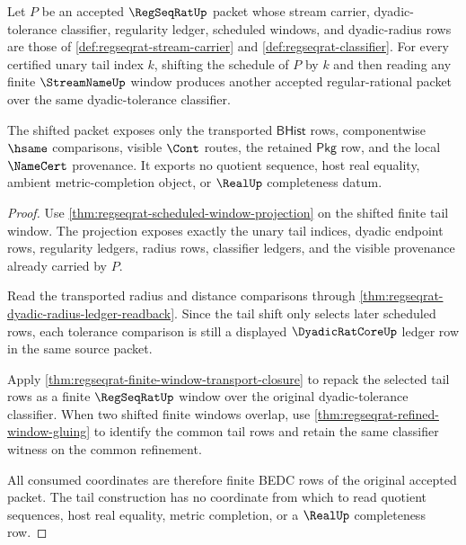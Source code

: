 \begin{theorem}
\label{thm:regseqrat-shifted-tail-regularity-closure}
Let $P$ be an accepted $\RegSeqRatUp$ packet whose stream carrier, dyadic-tolerance classifier, regularity ledger, scheduled windows, and dyadic-radius rows are those of \autoref{def:regseqrat-stream-carrier} and \autoref{def:regseqrat-classifier}. For every certified unary tail index $k$, shifting the schedule of $P$ by $k$ and then reading any finite $\StreamNameUp$ window produces another accepted regular-rational packet over the same dyadic-tolerance classifier.

The shifted packet exposes only the transported $\mathsf{BHist}$ rows, componentwise $\hsame$ comparisons, visible $\Cont$ routes, the retained $\mathsf{Pkg}$ row, and the local $\NameCert$ provenance. It exports no quotient sequence, host real equality, ambient metric-completion object, or $\RealUp$ completeness datum.
\end{theorem}
\begin{proof}
Use \autoref{thm:regseqrat-scheduled-window-projection} on the shifted finite tail window. The projection exposes exactly the unary tail indices, dyadic endpoint rows, regularity ledgers, radius rows, classifier ledgers, and the visible provenance already carried by $P$.

Read the transported radius and distance comparisons through \autoref{thm:regseqrat-dyadic-radius-ledger-readback}. Since the tail shift only selects later scheduled rows, each tolerance comparison is still a displayed $\DyadicRatCoreUp$ ledger row in the same source packet.

Apply \autoref{thm:regseqrat-finite-window-transport-closure} to repack the selected tail rows as a finite $\RegSeqRatUp$ window over the original dyadic-tolerance classifier. When two shifted finite windows overlap, use \autoref{thm:regseqrat-refined-window-gluing} to identify the common tail rows and retain the same classifier witness on the common refinement.

All consumed coordinates are therefore finite BEDC rows of the original accepted packet. The tail construction has no coordinate from which to read quotient sequences, host real equality, metric completion, or a $\RealUp$ completeness row.
\end{proof}

